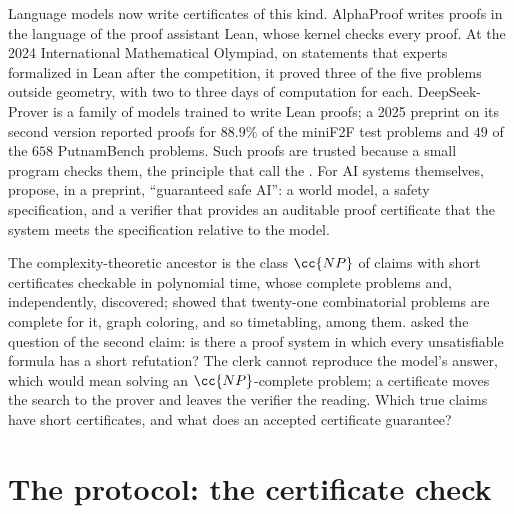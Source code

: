 \begin{refsection}
Language models now write certificates of this kind. AlphaProof \parencite{HubertEtAl2026} writes proofs in the language of the proof assistant Lean, whose kernel checks every proof. At the 2024 International Mathematical Olympiad, on statements that experts formalized in Lean after the competition, it proved three of the five problems outside geometry, with two to three days of computation for each. DeepSeek-Prover \parencite{XinEtAl2024,RenEtAl2025} is a family of models trained to write Lean proofs; a 2025 preprint on its second version reported proofs for $88.9\%$ of the miniF2F test problems and $49$ of the $658$ PutnamBench problems. Such proofs are trusted because a small program checks them, the principle that \textcite{BarendregtWiedijk2005} call the . For AI systems themselves, \textcite{DalrympleEtAl2024} propose, in a preprint, ``guaranteed safe AI'': a world model, a safety specification, and a verifier that provides an auditable proof certificate that the system meets the specification relative to the model.

The complexity-theoretic ancestor is the class $\cc{NP}$ of claims with short certificates checkable in polynomial time, whose complete problems \textcite{Cook1971} and, independently, \textcite{Levin1973} discovered; \textcite{Karp1972} showed that twenty-one combinatorial problems are complete for it, graph coloring, and so timetabling, among them. \Textcite{CookReckhow1979} asked the question of the second claim: is there a proof system in which every unsatisfiable formula has a short refutation? The clerk cannot reproduce the model's answer, which would mean solving an $\cc{NP}$-complete problem; a certificate moves the search to the prover and leaves the verifier the reading. Which true claims have short certificates, and what does an accepted certificate guarantee?

\section{The protocol: the certificate check}\label{sec:certificates:protocol}


\end{refsection}
